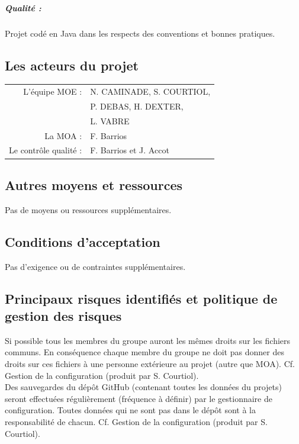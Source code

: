 \documentclass[11pt,a4paper,titlepage,openright]{report}
\begin{document}
    \subparagraph{Qualité :}
    Projet codé en Java dans les respects des conventions et bonnes pratiques.

    \subsection{Les acteurs du projet}

    \begin{center}
        \begin{tabular}{rl}
            L'équipe MOE :        & N. CAMINADE, S. COURTIOL, \\
                                  & P. DEBAS, H. DEXTER,      \\
                                  & L. VABRE                  \\
            La MOA :              & F. Barrios                \\
            Le contrôle qualité : & F. Barrios et J. Accot    \\
        \end{tabular}
    \end{center}

    \subsection{Autres moyens et ressources}
    Pas de moyens ou ressources supplémentaires.

    \subsection{Conditions d’acceptation}
    Pas d’exigence ou de contraintes supplémentaires.

    \subsection{Principaux risques identifiés et politique de gestion des risques}
    Si possible tous les membres du groupe auront les mêmes droits sur les fichiers communs. En conséquence chaque membre du groupe ne doit pas donner des droits sur ces fichiers à une personne extérieure au projet (autre que MOA). Cf. Gestion de la configuration (produit par S. Courtiol).
    \\Des sauvegardes du dépôt GitHub (contenant toutes les données du projets) seront effectuées régulièrement (fréquence à définir) par le gestionnaire de configuration. Toutes données qui ne sont pas dans le dépôt sont à la responsabilité de chacun. Cf. Gestion de la configuration (produit par S. Courtiol).
\end{document}
